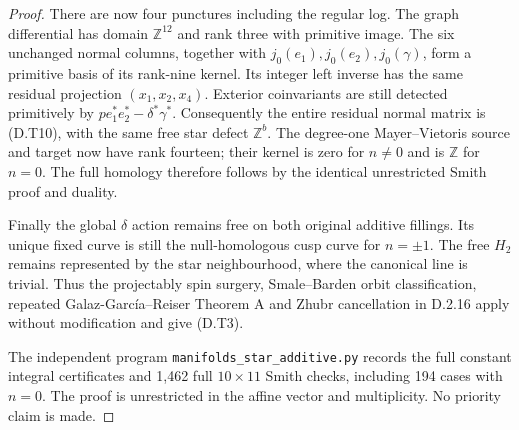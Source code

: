 \begin{proof}
There are now four punctures including the regular log.
The graph differential has domain $\mathbb Z^{12}$ and
rank three with primitive image. The six unchanged normal
columns, together with $j_0(e_1),j_0(e_2),j_0(\gamma)$,
form a primitive basis of its rank-nine kernel. Its integer
left inverse has the same residual projection
$(x_1,x_2,x_4)$. Exterior coinvariants are still detected
primitively by $p e_1^*e_2^*-\delta^*\gamma^*$.
Consequently the entire residual normal matrix is (D.T10),
with the same free star defect $\mathbb Z^b$.
The degree-one Mayer--Vietoris source and target now have
rank fourteen; their kernel is zero for $n\ne0$ and is
$\mathbb Z$ for $n=0$. The full homology therefore follows
by the identical unrestricted Smith proof and duality.

Finally the global $\delta$ action remains free on both
original additive fillings. Its unique fixed curve is
still the null-homologous cusp curve for $n=\pm1$.
The free $H_2$ remains represented by the star neighbourhood,
where the canonical line is trivial. Thus the projectably
spin surgery, Smale--Barden orbit classification, repeated
Galaz-Garc\'ia--Reiser Theorem A and Zhubr cancellation in
D.2.16 apply without modification and give (D.T3).

The independent program
\texttt{manifolds\_star\_additive.py} records the full
constant integral certificates and 1,462 full $10\times11$
Smith checks, including 194 cases with $n=0$. The proof is
unrestricted in the affine vector and multiplicity. No
priority claim is made.
\end{proof}
